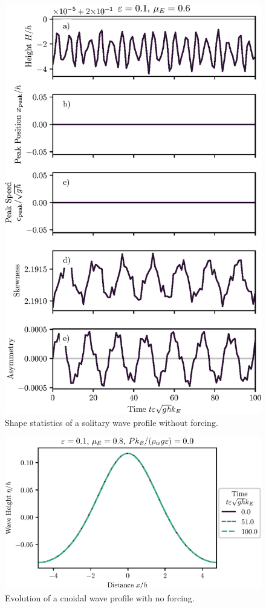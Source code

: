 \documentclass{jfm}
\begin{document}
\begin{figure}
  \centering
  \includegraphics{LongStatistics-Solitary-no-NuBi.eps}
  \caption{
    Shape statistics of a solitary wave profile without forcing.
  }
\end{figure}

\begin{figure}
  \centering
  \includegraphics{Long-Run-Cnoidal-no-NuBi.eps}
  \caption{
    Evolution of a cnoidal wave profile with no forcing.
  }
\end{figure}
\end{document}
